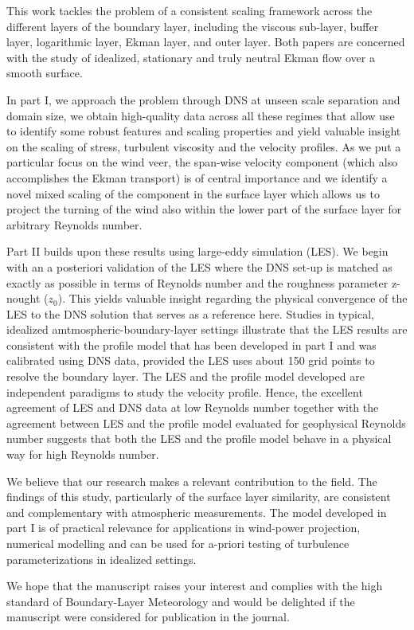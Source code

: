 \documentclass[brief]{fub}
\begin{document}
%
This work tackles the problem of a consistent scaling framework across the different layers of the boundary layer,
including the viscous sub-layer, buffer layer, logarithmic layer, Ekman layer, and outer layer. Both papers 
are concerned with the study of idealized, stationary and truly neutral Ekman flow over a smooth surface. 
%
\par
%
In part I, we approach the problem through DNS at unseen scale separation and domain size, we obtain high-quality data across all
these regimes that allow use to identify some robust features and scaling properties and yield valuable insight
on the scaling of stress, turbulent viscosity and the velocity profiles.
%
As we put a particular focus on the wind veer, the span-wise velocity component (which also accomplishes the Ekman transport)
is of central importance and we identify a novel mixed scaling of the component in the surface layer which allows us
to project the turning of the wind also within the lower part of the surface layer for arbitrary Reynolds number.
% 
\par
%
Part II builds upon these results using large-eddy simulation (LES). We begin with an a posteriori validation of the LES where
the DNS set-up is matched as exactly as possible in terms of Reynolds number and the roughness parameter z-nought ($z_0$).
This yields valuable insight regarding the physical convergence of the LES to the DNS solution that serves as a reference here. 
%
Studies in typical, idealized amtmospheric-boundary-layer settings illustrate that the LES results are consistent with
the profile model that has been developed in part I and was calibrated using DNS data, provided the LES uses about 150 grid points to resolve the boundary layer.
%
The LES and the profile model developed are independent paradigms to study the velocity profile. Hence, the excellent agreement of LES and DNS data at low Reynolds number together with the agreement between LES and the profile model evaluated for geophysical Reynolds number suggests that both the LES and the profile model behave in a physical way for high Reynolds number. 
%
\par
%
We believe that our research makes a relevant contribution to the field.
%
The findings of this study, particularly of the surface layer similarity, are consistent and
complementary with atmospheric measurements.
%
The model developed in part I is of practical relevance for applications in wind-power projection, numerical modelling
and can be used for a-priori testing of turbulence parameterizations in idealized settings. 
%
\par
%
We hope that the manuscript raises your interest and complies with the high standard of Boun\-da\-ry-Layer Meteorology and  would be delighted if the manuscript were considered for publication in the journal.
\end{document}
